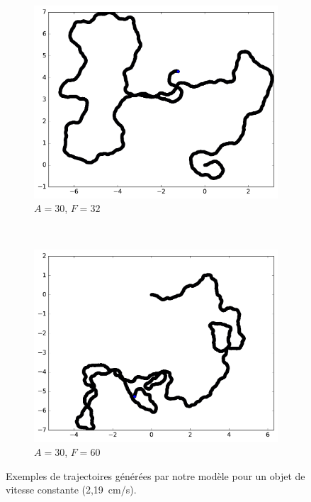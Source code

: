 \begin{figure}[htb]
\begin{subfigure}[t]{\subImgWmo}
			\includegraphics[width=\textwidth]{figures/ch3/synTraj_219_30_32}
			\caption[$A = 30$, $F=32$]{$A = 30$, $F=32$}
			\label{fig:synTraj_219_30_32}
		\end{subfigure}
		~
		\begin{subfigure}[t]{\subImgWmo}
			\centering
			\includegraphics[width=\textwidth]{figures/ch3/synTraj_219_30_60}
			\caption[$A = 30$, $F=60$]{$A = 30$, $F=60$}
			\label{fig:synTraj_219_30_60}
		\end{subfigure}
		\caption[Mouvements générés par notre modèle]{Exemples de trajectoires générées par notre modèle pour un objet de vitesse constante (2,19~cm/s).}
		\label{fig:motion1530}
	\end{figure}
	
